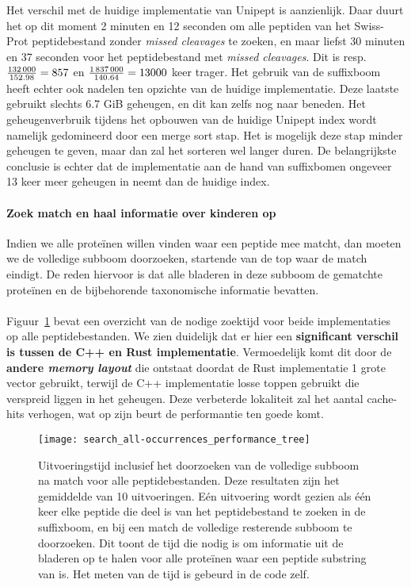 Het verschil met de huidige implementatie van Unipept is aanzienlijk.
Daar duurt het op dit moment 2 minuten en 12 seconden om alle peptiden van het Swiss-Prot peptidebestand zonder \textit{missed cleavages} te zoeken,
en maar liefst 30 minuten en 37 seconden voor het peptidebestand met \textit{missed cleavages}.
Dit is resp.~$\frac{132\thinspace000}{152.98} = 857$ en $\frac{1\thinspace837\thinspace000}{140.64} = 13 000$ keer trager.
Het gebruik van de suffixboom heeft echter ook nadelen ten opzichte van de huidige implementatie.
Deze laatste gebruikt slechts 6.7 GiB geheugen, en dit kan zelfs nog naar beneden.
Het geheugenverbruik tijdens het opbouwen van de huidige Unipept index wordt namelijk gedomineerd door een merge sort stap.
Het is mogelijk deze stap minder geheugen te geven, maar dan zal het sorteren wel langer duren.
De belangrijkste conclusie is echter dat de implementatie aan de hand van suffixbomen ongeveer 13 keer meer geheugen in neemt dan de huidige index.

\paragraph{Zoek match en haal informatie over kinderen op}
Indien we alle proteïnen willen vinden waar een peptide mee matcht, dan moeten we de volledige subboom doorzoeken, startende van de top waar de match eindigt.
De reden hiervoor is dat alle bladeren in deze subboom de gematchte proteïnen en de bijbehorende taxonomische informatie bevatten.
\\ \\
Figuur~\ref{fig:performance_all-occurrences_tree} bevat een overzicht van de nodige zoektijd voor beide implementaties op alle peptidebestanden.
We zien duidelijk dat er hier een \textbf{significant verschil is tussen de C++ en Rust implementatie}.
Vermoedelijk komt dit door de \textbf{andere \textit{memory layout}} die ontstaat doordat de Rust implementatie 1 grote vector gebruikt, terwijl de C++ implementatie losse toppen gebruikt die verspreid liggen in het geheugen.
Deze verbeterde lokaliteit zal het aantal cache-hits verhogen, wat op zijn beurt de performantie ten goede komt.

\begin{figure}[ht]
    \centering
    \texttt{[image: search\_all-occurrences\_performance\_tree]}
    \caption{Uitvoeringstijd inclusief het doorzoeken van de volledige subboom na match voor alle peptidebestanden. Deze resultaten zijn het gemiddelde van 10 uitvoeringen. Eén uitvoering wordt gezien als één keer elke peptide die deel is van het peptidebestand te zoeken in de suffixboom, en bij een match de volledige resterende subboom te doorzoeken. Dit toont de tijd die nodig is om informatie uit de bladeren op te halen voor alle proteïnen waar een peptide substring van is. Het meten van de tijd is gebeurd in de code zelf.}
    \label{fig:performance_all-occurrences_tree}
\end{figure}


